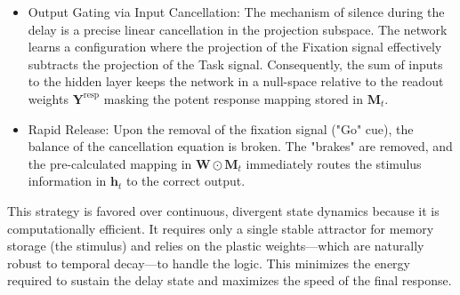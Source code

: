 \documentclass{article}
\begin{document}
\begin{center}
{\begin{minipage}{0.9\columnwidth}
\begin{itemize}
    \item Output Gating via Input Cancellation: The mechanism of silence during the delay is a precise linear cancellation in the projection subspace. The network learns a configuration where the projection of the Fixation signal effectively subtracts the projection of the Task signal. Consequently, the sum of inputs to the hidden layer keeps the network in a null-space relative to the readout weights $\mathbf{Y}^{\text{resp}}$ masking the potent response mapping stored in $\mathbf{M}_t$.
    \item Rapid Release: Upon the removal of the fixation signal ("Go" cue), the balance of the cancellation equation is broken. The "brakes" are removed, and the pre-calculated mapping in $\mathbf{W} \odot \mathbf{M}_t$ immediately routes the stimulus information in $\mathbf{h}_t$ to the correct output.
\end{itemize}
This strategy is favored over continuous, divergent state dynamics because it is computationally efficient. It requires only a single stable attractor for memory storage (the stimulus) and relies on the plastic weights—which are naturally robust to temporal decay—to handle the logic. This minimizes the energy required to sustain the delay state and maximizes the speed of the final response.
\end{minipage}
}
\end{center}

\end{document}
